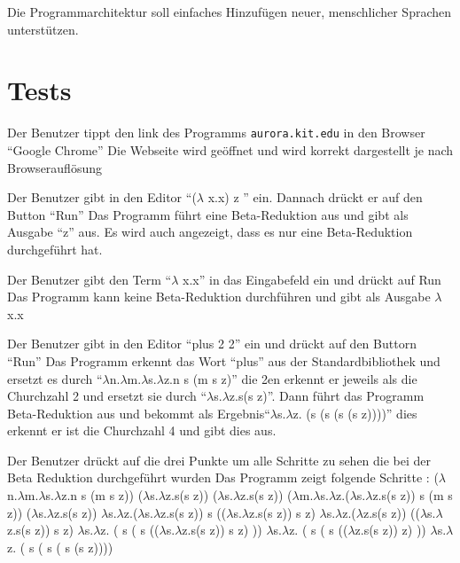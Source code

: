 \documentclass[parskip=full,11pt,twoside]{scrartcl}
\begin{document}
Die Programmarchitektur soll einfaches Hinzufügen neuer, menschlicher Sprachen unterstützen.


\section{Tests}


{Der Benutzer tippt den link des Programms \texttt{aurora.kit.edu} in den Browser \enquote {Google Chrome} }
{ Die Webseite wird geöffnet und wird korrekt dargestellt je nach Browserauflösung}

{ Der Benutzer gibt in den Editor \enquote {($\lambda$ x.x) z } ein. Dannach drückt er auf den Button \enquote {Run}}
{ Das Programm führt eine Beta-Reduktion aus und gibt als Ausgabe \enquote {z} aus. Es wird auch angezeigt, dass es nur eine Beta-Reduktion durchgeführt hat.}

{Der Benutzer gibt den Term \enquote {$\lambda$ x.x} in das Eingabefeld ein und drückt auf Run}
{Das Programm kann keine Beta-Reduktion durchführen und gibt als Ausgabe $\lambda$ x.x}

{Der Benutzer gibt in den Editor \enquote {plus 2 2} ein und drückt auf den Buttorn \enquote {Run}}
{ Das Programm erkennt das Wort \enquote {plus} aus der Standardbibliothek und ersetzt es durch \enquote {$\lambda$n.$\lambda$m.$\lambda$s.$\lambda$z.n s (m s z)} die 2en erkennt er jeweils als die Churchzahl 2 und ersetzt sie durch \enquote {$\lambda$s.$\lambda$z.s(s z)}. Dann führt das Programm Beta-Reduktion aus und bekommt als Ergebnis\enquote {$\lambda$s.$\lambda$z. (s (s (s (s z))))} dies erkennt er ist die Churchzahl 4 und gibt dies aus. }

{ Der Benutzer drückt auf die drei Punkte um alle Schritte zu sehen die bei der Beta Reduktion durchgeführt wurden }
{ Das Programm zeigt folgende Schritte :
\newline ($\lambda$n.$\lambda$m.$\lambda$s.$\lambda$z.n s (m s z)) ($\lambda$s.$\lambda$z.s(s z)) ($\lambda$s.$\lambda$z.s(s z))
\newline ($\lambda$m.$\lambda$s.$\lambda$z.($\lambda$s.$\lambda$z.s(s z)) s (m s z)) ($\lambda$s.$\lambda$z.s(s z))
\newline $\lambda$s.$\lambda$z.($\lambda$s.$\lambda$z.s(s z)) s (($\lambda$s.$\lambda$z.s(s z)) s z)
\newline $\lambda$s.$\lambda$z.($\lambda$z.s(s z)) (($\lambda$s.$\lambda$z.s(s z)) s z)
\newline $\lambda$s.$\lambda$z. ( s ( s (($\lambda$s.$\lambda$z.s(s z)) s z) ))
\newline $\lambda$s.$\lambda$z. ( s ( s (($\lambda$z.s(s z)) z) ))
\newline $\lambda$s.$\lambda$z. ( s ( s ( s (s z))))
 }
\end{document}
